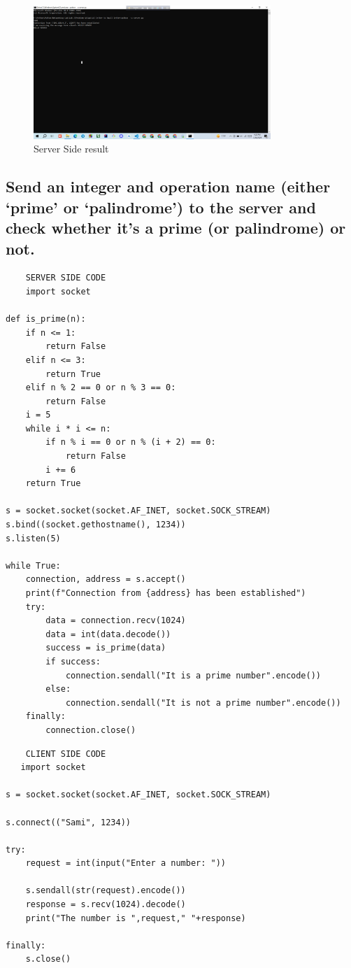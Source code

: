 \documentclass[11pt]{article}
\begin{document}
\begin{itemize}
    \begin{figure}[H]
      \centering
      \includegraphics[width=0.8\textwidth]{small_result.server.png}
      \caption{Server Side result}
      \label{fig:4}
    \end{figure}

\end{itemize}

 
\subsection{Send an integer and operation name (either ‘prime’ or ‘palindrome’) to the server and check whether it’s a prime (or palindrome) or not.}
    \begin{verbatim}
    SERVER SIDE CODE
    import socket

def is_prime(n):
    if n <= 1:
        return False
    elif n <= 3:
        return True
    elif n % 2 == 0 or n % 3 == 0:
        return False
    i = 5
    while i * i <= n:
        if n % i == 0 or n % (i + 2) == 0:
            return False
        i += 6
    return True

s = socket.socket(socket.AF_INET, socket.SOCK_STREAM)
s.bind((socket.gethostname(), 1234))
s.listen(5)

while True:
    connection, address = s.accept()
    print(f"Connection from {address} has been established")
    try:
        data = connection.recv(1024)
        data = int(data.decode())
        success = is_prime(data)
        if success:
            connection.sendall("It is a prime number".encode())
        else:
            connection.sendall("It is not a prime number".encode())
    finally:
        connection.close()

\end{verbatim}
    \begin{verbatim}
    CLIENT SIDE CODE
   import socket

s = socket.socket(socket.AF_INET, socket.SOCK_STREAM)

s.connect(("Sami", 1234))

try:
    request = int(input("Enter a number: "))

    s.sendall(str(request).encode())
    response = s.recv(1024).decode()
    print("The number is ",request," "+response)

finally:
    s.close()
\end{verbatim}
\end{document}
